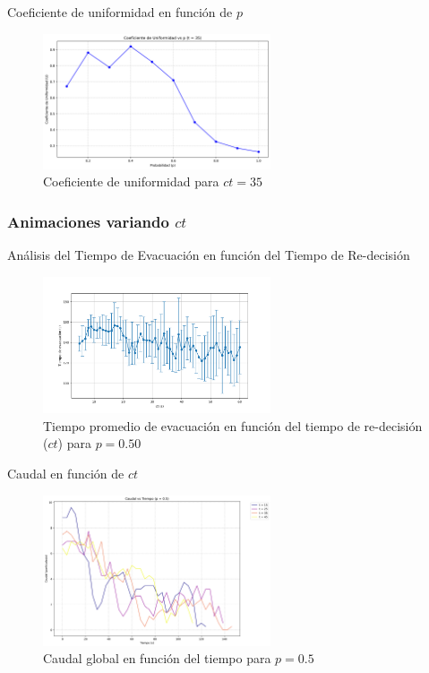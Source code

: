 \documentclass[aspectratio=169]{beamer}
\begin{document}
\begin{frame}{Coeficiente de uniformidad en función de $p$}
    \begin{figure}[H]
        \centering
        \includegraphics[width=0.6\textwidth]{img/uniformity_vs_p_t35.png}
        \caption{Coeficiente de uniformidad para $ct=35$}
        \label{fig:flow_p100}
    \end{figure}
\end{frame}

\begin{frame}
    \frametitle{Animaciones variando $ct$}
\end{frame}

\begin{frame}{Análisis del Tiempo de Evacuación en función del Tiempo de Re-decisión}
    \begin{figure}[H]
        \centering
        \includegraphics[width=0.6\textwidth]{img/evacuation_times_p_0.5.png}
        \caption{Tiempo promedio de evacuación en función del tiempo de re-decisión ($ct$) para $p=0.50$}
        \label{fig:evac_time_ct}
    \end{figure}    
\end{frame}

\begin{frame}{Caudal en función de $ct$}
    \begin{figure}[H]
        \centering
        \includegraphics[width=0.6\textwidth]{img/flow_rates_p0.5.png}
        \caption{Caudal global en función del tiempo para $p=0.5$}
        \label{fig:flow_p100}
    \end{figure}    
\end{frame}
\end{document}
